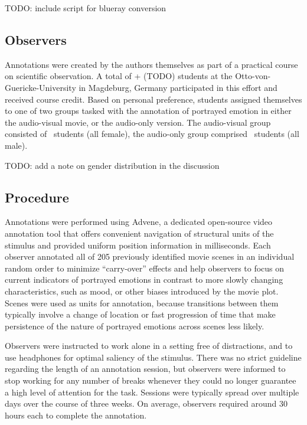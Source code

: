 TODO: include script for blueray conversion

\subsection*{Observers}

Annotations were created by the authors themselves as part of a practical
course on scientific observation. A total of \AVTotalRaters +\AOTotalRaters
(TODO) students at the Otto-von-Guericke-University in Magdeburg, Germany
participated in this effort and received course credit.  Based on personal
preference, students assigned themselves to one of two groups tasked with the
annotation of portrayed emotion in either the audio-visual movie, or the
audio-only version. The audio-visual group consisted of \AVTotalRaters\
students (all female), the audio-only group comprised \AOTotalRaters\ students
(all male).

TODO: add a note on gender distribution in the discussion

\subsection*{Procedure}

Annotations were performed using Advene\cite{AP2005}, a dedicated open-source
video annotation tool that offers convenient navigation of structural units of
the stimulus and provided uniform position information in milliseconds.  Each
observer annotated all of 205 previously identified movie scenes in an
individual random order to minimize ``carry-over'' effects and help observers
to focus on current indicators of portrayed emotions in contrast to more slowly
changing characteristics, such as mood, or other biases introduced by the movie
plot. Scenes were used as units for annotation, because transitions between
them typically involve a change of location or fast progression of time that
make persistence of the nature of portrayed emotions across scenes less likely.

Observers were instructed to work alone in a setting free of distractions, and
to use headphones for optimal saliency of the stimulus. There was no strict
guideline regarding the length of an annotation session, but observers were
informed to stop working for any number of breaks whenever they could no longer
guarantee a high level of attention for the task. Sessions were typically
spread over multiple days over the course of three weeks. On average, observers
required around 30 hours each to complete the annotation.

